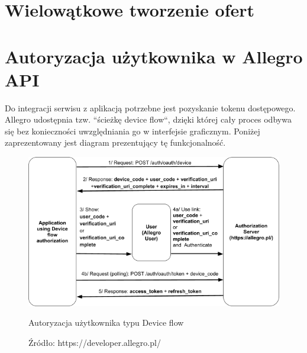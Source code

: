 
\section{Wielowątkowe tworzenie ofert}
\newpage


\section{Autoryzacja użytkownika w Allegro API}

Do integracji serwisu z aplikacją potrzebne jest pozyskanie tokenu dostępowego. Allegro udostępnia tzw. ``ścieżkę device flow``, dzięki której cały proces odbywa się bez konieczności uwzględniania go w interfejsie graficznym. Poniżej zaprezentowany jest diagram prezentujący tę funkcjonalność.\\

\begin{figure}[H]
	\centering
	\includegraphics[width=\linewidth]{device_flow.png}
	\caption{Autoryzacja użytkownika typu Device flow}
	\caption*{Źródło: {https://developer.allegro.pl/}}
\end{figure}

